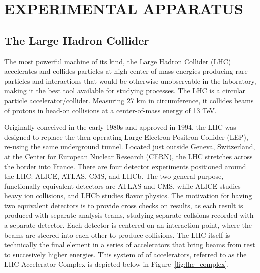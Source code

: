%
%

\chapter{EXPERIMENTAL APPARATUS}

\section{The Large Hadron Collider}
The most powerful machine of its kind, the Large Hadron
Collider (LHC) accelerates and collides particles
at high center-of-mass energies producing rare
particles and interactions that would be otherwise unobservable
in the laboratory, making it the best tool available for studying \tth
processes. The LHC is a circular particle accelerator/collider. Measuring 27 km
in circumference, it collides beams of protons in head-on collisions       
at a center-of-mass energy of 13 TeV.

Originally conceived in the early 1980s and approved in 1994, the LHC was designed to replace the then-operating
Large Electron Positron Collider (LEP), re-using the same underground tunnel. Located just outside Geneva, Switzerland, at the Center for European Nuclear Research (CERN),
the LHC stretches across the border into France. There are four detector experiments positioned around the LHC: ALICE, ATLAS, CMS, and LHCb. The two general purpose,
functionally-equivalent detectors are ATLAS and CMS, while ALICE studies heavy ion collisions, and LHCb studies flavor physics. 
The motivation for having two equivalent detectors is to provide cross checks on results, as each result is produced with separate analysis teams, studying separate collsions
recorded with a separate detector. Each detector is centered on an interaction point, where the beams are steered into each other to produce collisions. 
The LHC itself is technically the final element in a series of accelerators
that bring beams from rest to succesively higher energies. This system of
of accelerators, referred to as the LHC Accelerator Complex is depicted below in
Figure~\ref{fig:lhc_complex}.

